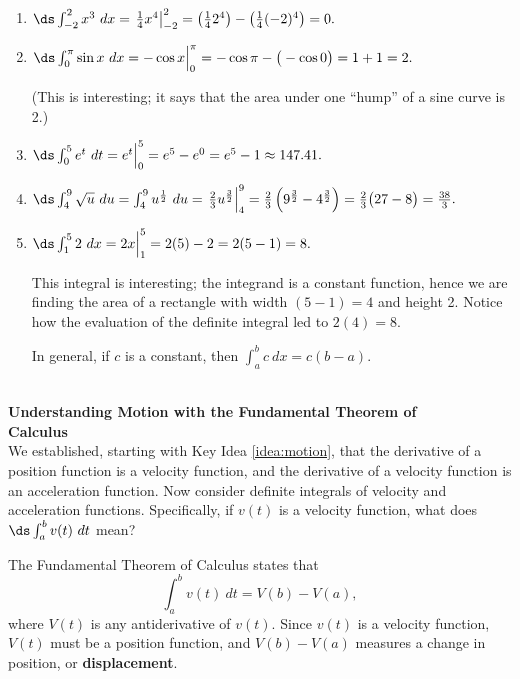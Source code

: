 {\begin{enumerate}
\item	$\ds \int_{-2}^2 x^3\ dx = \left.\frac14x^4\right|_{-2}^2 = \left(\frac142^4\right) - \left(\frac14(-2)^4\right) = 0.$
\item		$\ds \int_0^\pi \sin x\ dx = -\cos x\Big|_0^\pi = -\cos \pi- \big(-\cos 0\big) = 1+1=2.$ 

(This is interesting; it says that the area under one ``hump'' of a sine curve is 2.)
\item	 $\ds \int_0^5e^t\ dt = e^t\Big|_0^5 = e^5 - e^0 = e^5-1 \approx 147.41.$
\item		$\ds \int_4^9 \sqrt{u}\ du = \int_4^9 u^\frac12\ du = \left.\frac23u^\frac32\right|_4^9 = \frac23\left(9^\frac32-4^\frac32\right) = \frac23\big(27-8\big) =\frac{38}3.$
\item		$\ds \int_1^5 2\ dx = 2x\Big|_1^5 = 2(5)-2=2(5-1)=8.$ 

This integral is interesting; the integrand is a constant function, hence we are finding the area of a rectangle with width $(5-1)=4$ and height 2. Notice how the evaluation of the definite integral led to $2(4)=8$. 

In general, if $c$ is a constant, then $\int_a^b c\ dx = c(b-a)$.
\end{enumerate}
\vskip -15pt
}\\

\noindent\textbf{\large Understanding Motion with the Fundamental Theorem of\\
 Calculus}\\

We established, starting with Key Idea \ref{idea:motion}, that the derivative of a position function is a velocity function, and the derivative of a velocity function is an acceleration function. Now consider definite integrals of velocity and acceleration functions. Specifically, if $v(t)$ is a velocity function, what does $\ds \int_a^b v(t)\ dt$ mean?

The Fundamental Theorem of Calculus states that
\[
\int_a^b v(t)\ dt = V(b) - V(a),
\]
 where $V(t)$ is any antiderivative of $v(t)$. Since $v(t)$ is a velocity function, $V(t)$ must be a position function, and $V(b) - V(a)$ measures a change in position, or \textbf{displacement}.\\

